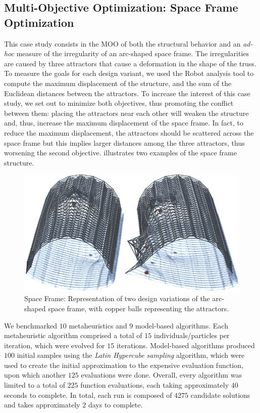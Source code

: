 \subsection{Multi-Objective Optimization: Space Frame Optimization}
This case study consists in the \ac{MOO} of both the structural behavior and an \textit{ad-hoc} measure of the irregularity of an arc-shaped space frame. The irregularities are caused by three attractors that cause a deformation in the shape of the truss. To measure the goals for each design variant, we used the Robot analysis tool to compute the maximum displacement of the structure, and the sum of the Euclidean distances between the attractors. To increase the interest of this case study, we set out to minimize both objectives, thus promoting the conflict between them: placing the attractors near each other will weaken the structure and, thus, increase the maximum displacement of the space frame. In fact, to reduce the maximum displacement, the attractors should be scattered across the space frame but this implies larger distances among the three attractors, thus worsening the second objective.  illustrates two examples of the space frame structure.
 
\begin{figure}[]
	\centering
	\includegraphics[width=\columnwidth]{Images/spaceframe/truss-kat-small.png}
	\caption{Space Frame: Representation of two design variations of the arc-shaped space frame, with copper balls representing the attractors.}
	\label{fig:spaceframe}
\end{figure}

We benchmarked $10$ metaheuristics and $9$ model-based algorithms. Each metaheuristic algorithm comprised a total of $15$ individuals/particles per iteration, which were evolved for $15$ iterations. Model-based algorithms produced $100$ initial samples using the \textit{Latin Hypercube sampling} algorithm, which were used to create the initial approximation to the expensive evaluation function, upon which another $125$ evaluations were done. Overall, every algorithm was limited to a total of $225$ function evaluations, each taking approximately $40$ seconds to complete. In total, each run is composed of $4275$ candidate solutions and takes approximately $2$ days to complete.

